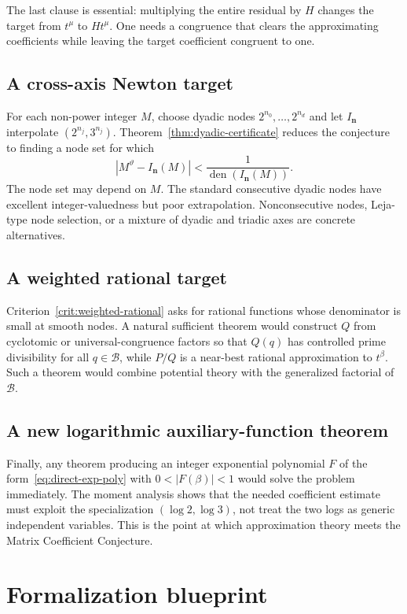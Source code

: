 \documentclass[11pt,oneside]{article}
\theoremstyle{definition}
\theoremstyle{remark}
\newcommand{\Bsem}{\mathcal B}
\newcommand{\den}{\operatorname{den}}
\newcommand{\thetaq}{\vartheta}
\begin{document}
The last clause is essential: multiplying the entire residual by $H$ changes the target from
$t^\mu$ to $Ht^\mu$.  One needs a congruence that clears the approximating coefficients while
leaving the target coefficient congruent to one.

\subsection{A cross-axis Newton target}

For each non-power integer $M$, choose dyadic nodes
$2^{n_0},\ldots,2^{n_d}$ and let $I_{\mathbf n}$ interpolate
$(2^{n_j},3^{n_j})$.  Theorem~\ref{thm:dyadic-certificate} reduces the conjecture to finding a
node set for which
\[
 \left|M^{\thetaq}-I_{\mathbf n}(M)\right|
 <\frac1{\den(I_{\mathbf n}(M))}.
\]
The node set may depend on $M$.  The standard consecutive dyadic nodes have excellent
integer-valuedness but poor extrapolation.  Nonconsecutive nodes, Leja-type node selection,
or a mixture of dyadic and triadic axes are concrete alternatives.

\subsection{A weighted rational target}

Criterion~\ref{crit:weighted-rational} asks for rational functions whose denominator is small
at smooth nodes.  A natural sufficient theorem would construct $Q$ from cyclotomic or
universal-congruence factors so that $Q(q)$ has controlled prime divisibility for all
$q\in\Bsem$, while $P/Q$ is a near-best rational approximation to $t^\beta$.  Such a theorem
would combine potential theory with the generalized factorial of $\Bsem$.

\subsection{A new logarithmic auxiliary-function theorem}

Finally, any theorem producing an integer exponential polynomial
$F$ of the form~\eqref{eq:direct-exp-poly} with
$0<|F(\beta)|<1$ would solve the problem immediately.  The moment analysis shows that the needed
coefficient estimate must exploit the specialization $(\log2,\log3)$, not treat the two logs
as generic independent variables.  This is the point at which approximation theory meets the
Matrix Coefficient Conjecture.


\section{Formalization blueprint}
\label{sec:formalization}
\end{document}
